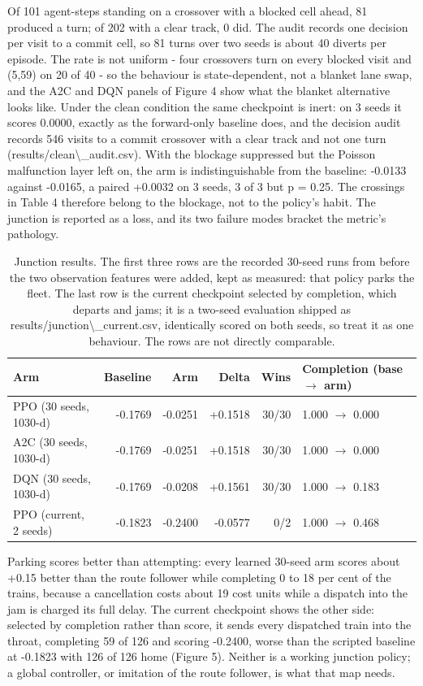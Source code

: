 \documentclass[11pt,a4paper]{article}
\begin{document}
Of 101 agent-steps standing on a crossover with a blocked cell ahead, 81 produced a turn; of 202 with a clear track, 0 did. The audit records one decision per visit to a commit cell, so 81 turns over two seeds is about 40 diverts per episode. The rate is not uniform - four crossovers turn on every blocked visit and (5,59) on 20 of 40 - so the behaviour is state-dependent, not a blanket lane swap, and the A2C and DQN panels of Figure 4 show what the blanket alternative looks like.
Under the clean condition the same checkpoint is inert: on 3 seeds it scores 0.0000, exactly as the forward-only baseline does, and the decision audit records 546 visits to a commit crossover with a clear track and not one turn (results/clean\textbackslash{}\_audit.csv). With the blockage suppressed but the Poisson malfunction layer left on, the arm is indistinguishable from the baseline: -0.0133 against -0.0165, a paired +0.0032 on 3 seeds, 3 of 3 but p = 0.25. The crossings in Table 4 therefore belong to the blockage, not to the policy's habit.
The junction is reported as a loss, and its two failure modes bracket the metric's pathology.
\begin{table}[htbp]
\centering
\footnotesize
\begin{tabular}{@{}lrrrrp{3.6cm}@{}}
\toprule
\textbf{Arm} & \textbf{Baseline} & \textbf{Arm} & \textbf{Delta} & \textbf{Wins} & \textbf{Completion (base $\rightarrow$ arm)} \\
\midrule
PPO (30 seeds, 1030-d) & -0.1769 & -0.0251 & +0.1518 & 30/30 & 1.000 $\rightarrow$ 0.000 \\
A2C (30 seeds, 1030-d) & -0.1769 & -0.0251 & +0.1518 & 30/30 & 1.000 $\rightarrow$ 0.000 \\
DQN (30 seeds, 1030-d) & -0.1769 & -0.0208 & +0.1561 & 30/30 & 1.000 $\rightarrow$ 0.183 \\
PPO (current, 2 seeds) & -0.1823 & -0.2400 & -0.0577 & 0/2 & 1.000 $\rightarrow$ 0.468 \\
\bottomrule
\end{tabular}
\caption{Junction results. The first three rows are the recorded 30-seed runs from before the two observation features were added, kept as measured: that policy parks the fleet. The last row is the current checkpoint selected by completion, which departs and jams; it is a two-seed evaluation shipped as results/junction\textbackslash{}\_current.csv, identically scored on both seeds, so treat it as one behaviour. The rows are not directly comparable.}
\end{table}
Parking scores better than attempting: every learned 30-seed arm scores about +0.15 better than the route follower while completing 0 to 18 per cent of the trains, because a cancellation costs about 19 cost units while a dispatch into the jam is charged its full delay. The current checkpoint shows the other side: selected by completion rather than score, it sends every dispatched train into the throat, completing 59 of 126 and scoring -0.2400, worse than the scripted baseline at -0.1823 with 126 of 126 home (Figure 5). Neither is a working junction policy; a global controller, or imitation of the route follower, is what that map needs.
\end{document}
